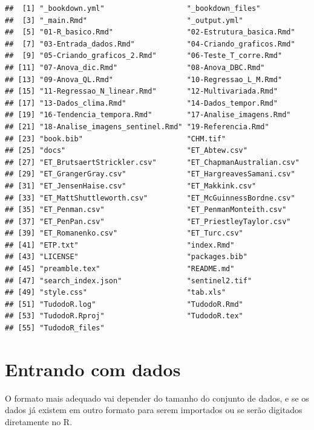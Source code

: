 \documentclass[
]{book}
\begin{document}
\begin{verbatim}
##  [1] "_bookdown.yml"                   "_bookdown_files"                
##  [3] "_main.Rmd"                       "_output.yml"                    
##  [5] "01-R_basico.Rmd"                 "02-Estrutura_basica.Rmd"        
##  [7] "03-Entrada_dados.Rmd"            "04-Criando_graficos.Rmd"        
##  [9] "05-Criando_graficos_2.Rmd"       "06-Teste_T_corre.Rmd"           
## [11] "07-Anova_dic.Rmd"                "08-Anova_DBC.Rmd"               
## [13] "09-Anova_QL.Rmd"                 "10-Regressao_L_M.Rmd"           
## [15] "11-Regressao_N_linear.Rmd"       "12-Multivariada.Rmd"            
## [17] "13-Dados_clima.Rmd"              "14-Dados_tempor.Rmd"            
## [19] "16-Tendencia_tempora.Rmd"        "17-Analise_imagens.Rmd"         
## [21] "18-Analise_imagens_sentinel.Rmd" "19-Referencia.Rmd"              
## [23] "book.bib"                        "CHM.tif"                        
## [25] "docs"                            "ET_Abtew.csv"                   
## [27] "ET_BrutsaertStrickler.csv"       "ET_ChapmanAustralian.csv"       
## [29] "ET_GrangerGray.csv"              "ET_HargreavesSamani.csv"        
## [31] "ET_JensenHaise.csv"              "ET_Makkink.csv"                 
## [33] "ET_MattShuttleworth.csv"         "ET_McGuinnessBordne.csv"        
## [35] "ET_Penman.csv"                   "ET_PenmanMonteith.csv"          
## [37] "ET_PenPan.csv"                   "ET_PriestleyTaylor.csv"         
## [39] "ET_Romanenko.csv"                "ET_Turc.csv"                    
## [41] "ETP.txt"                         "index.Rmd"                      
## [43] "LICENSE"                         "packages.bib"                   
## [45] "preamble.tex"                    "README.md"                      
## [47] "search_index.json"               "sentinel2.tif"                  
## [49] "style.css"                       "tab.xls"                        
## [51] "TudodoR.log"                     "TudodoR.Rmd"                    
## [53] "TudodoR.Rproj"                   "TudodoR.tex"                    
## [55] "TudodoR_files"
\end{verbatim}

\hypertarget{entrando-com-dados}{%
\section{Entrando com dados}\label{entrando-com-dados}}

O formato mais adequado vai depender do tamanho do conjunto de dados, e se os dados já existem em outro formato para serem importados ou se serão digitados diretamente no R.
\end{document}
